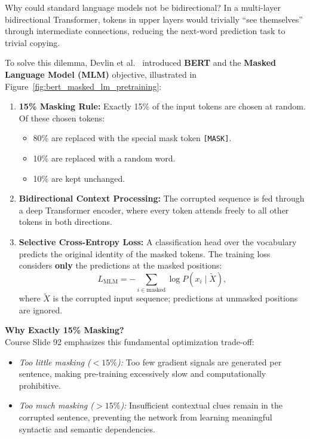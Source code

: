 Why could standard language models not be bidirectional? In a multi-layer bidirectional Transformer, tokens in upper layers would trivially “see themselves” through intermediate connections, reducing the next-word prediction task to trivial copying.

To solve this dilemma, Devlin et al.~\cite{devlin2019bert} introduced \textbf{BERT} and the \textbf{Masked Language Model (MLM)} objective, illustrated in Figure~\ref{fig:bert_masked_lm_pretraining}:

\begin{enumerate}[leftmargin=*]
    \item \textbf{15\% Masking Rule:} Exactly 15\% of the input tokens are chosen at random. Of these chosen tokens:
    \begin{itemize}[nosep]
        \item 80\% are replaced with the special mask token \texttt{[MASK]}.
        \item 10\% are replaced with a random word.
        \item 10\% are kept unchanged.
    \end{itemize}
    \item \textbf{Bidirectional Context Processing:} The corrupted sequence is fed through a deep Transformer encoder, where every token attends freely to all other tokens in both directions.
    \item \textbf{Selective Cross-Entropy Loss:} A classification head over the vocabulary predicts the original identity of the masked tokens. The training loss considers \textbf{only} the predictions at the masked positions:
    \begin{equation}
        L_{\text{MLM}} = -\sum_{i \in \text{masked}} \log P(x_i \mid \widetilde{X}),
    \end{equation}
    where $\widetilde{X}$ is the corrupted input sequence; predictions at unmasked positions are ignored.
\end{enumerate}

\begin{Notebox}
\textbf{Why Exactly 15\% Masking?} \\
Course Slide 92 emphasizes this fundamental optimization trade-off:
\begin{itemize}[nosep, leftmargin=*]
    \item \textit{Too little masking ($< 15\%$):} Too few gradient signals are generated per sentence, making pre-training excessively slow and computationally prohibitive.
    \item \textit{Too much masking ($> 15\%$):} Insufficient contextual clues remain in the corrupted sentence, preventing the network from learning meaningful syntactic and semantic dependencies.
\end{itemize}
\end{Notebox}

